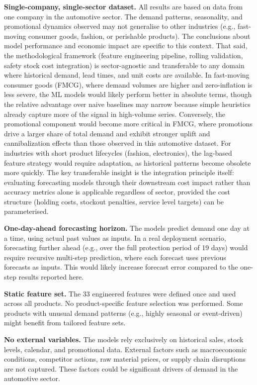 \textbf{Single-company, single-sector dataset.} All results are based on data from one company in the automotive sector. The demand patterns, seasonality, and promotional dynamics observed may not generalise to other industries (e.g., fast-moving consumer goods, fashion, or perishable products). The conclusions about model performance and economic impact are specific to this context. That said, the methodological framework (feature engineering pipeline, rolling validation, safety stock cost integration) is sector-agnostic and transferable to any domain where historical demand, lead times, and unit costs are available. In fast-moving consumer goods (FMCG), where demand volumes are higher and zero-inflation is less severe, the ML models would likely perform better in absolute terms, though the relative advantage over naive baselines may narrow because simple heuristics already capture more of the signal in high-volume series. Conversely, the promotional component would become more critical in FMCG, where promotions drive a larger share of total demand and exhibit stronger uplift and cannibalization effects than those observed in this automotive dataset. For industries with short product lifecycles (fashion, electronics), the lag-based feature strategy would require adaptation, as historical patterns become obsolete more quickly. The key transferable insight is the integration principle itself: evaluating forecasting models through their downstream cost impact rather than accuracy metrics alone is applicable regardless of sector, provided the cost structure (holding costs, stockout penalties, service level targets) can be parameterised.

\textbf{One-day-ahead forecasting horizon.} The models predict demand one day at a time, using actual past values as inputs. In a real deployment scenario, forecasting further ahead (e.g., over the full protection period of 19 days) would require recursive multi-step prediction, where each forecast uses previous forecasts as inputs. This would likely increase forecast error compared to the one-step results reported here.

\textbf{Static feature set.} The 33 engineered features were defined once and used across all products. No product-specific feature selection was performed. Some products with unusual demand patterns (e.g., highly seasonal or event-driven) might benefit from tailored feature sets.

\textbf{No external variables.} The models rely exclusively on historical sales, stock levels, calendar, and promotional data. External factors such as macroeconomic conditions, competitor actions, raw material prices, or supply chain disruptions are not captured. These factors could be significant drivers of demand in the automotive sector.

